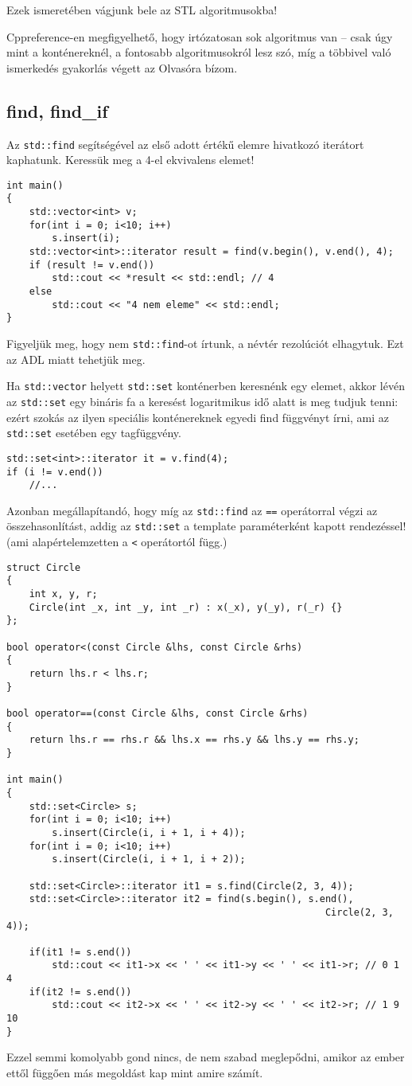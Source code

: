 \documentclass[a4paper,11.5pt,table]{article}
\begin{document}
	Ezek ismeretében vágjunk bele az STL algoritmusokba!
	\begin{note}
		Cppreference-en megfigyelhető, hogy irtózatosan sok algoritmus van -- csak úgy mint a konténereknél, a fontosabb algoritmusokról lesz szó, míg a többivel való ismerkedés gyakorlás végett az Olvasóra bízom.
	\end{note}
	\subsection{find, find\_if}
	Az \texttt{std::find} segítségével az első adott értékű elemre hivatkozó iterátort kaphatunk. Keressük meg a 4-el ekvivalens elemet!
	\begin{lstlisting}
int main()
{
	std::vector<int> v;
	for(int i = 0; i<10; i++)
		s.insert(i);
	std::vector<int>::iterator result = find(v.begin(), v.end(), 4);
	if (result != v.end())
		std::cout << *result << std::endl; // 4
	else
		std::cout << "4 nem eleme" << std::endl;
}
	\end{lstlisting}
	\begin{note}
		Figyeljük meg, hogy nem \texttt{std::find}-ot írtunk, a névtér rezolúciót elhagytuk. Ezt az ADL miatt tehetjük meg.
	\end{note}
	Ha \texttt{std::vector} helyett \texttt{std::set} konténerben keresnénk egy elemet, akkor lévén az \texttt{std::set} egy bináris fa a keresést logaritmikus idő alatt is meg tudjuk tenni: ezért szokás az ilyen speciális konténereknek egyedi find függvényt írni, ami az \texttt{std::set} esetében egy tagfüggvény. 
	\begin{lstlisting}
std::set<int>::iterator it = v.find(4);
if (i != v.end())
	//...
	\end{lstlisting}
	Azonban megállapítandó, hogy míg az \texttt{std::find} az \texttt{==} operátorral végzi az összehasonlítást, addig az \texttt{std::set} a template paraméterként kapott rendezéssel! (ami alapértelemzetten a \texttt{<} operátortól függ.)
\begin{lstlisting}
struct Circle
{
	int x, y, r;
	Circle(int _x, int _y, int _r) : x(_x), y(_y), r(_r) {}
};

bool operator<(const Circle &lhs, const Circle &rhs)
{
	return lhs.r < lhs.r;
}

bool operator==(const Circle &lhs, const Circle &rhs)
{
	return lhs.r == rhs.r && lhs.x == rhs.y && lhs.y == rhs.y;
}

int main()
{
	std::set<Circle> s;
	for(int i = 0; i<10; i++)
		s.insert(Circle(i, i + 1, i + 4));
	for(int i = 0; i<10; i++)
		s.insert(Circle(i, i + 1, i + 2));
	
	std::set<Circle>::iterator it1 = s.find(Circle(2, 3, 4));
	std::set<Circle>::iterator it2 = find(s.begin(), s.end(), 
														Circle(2, 3, 4));
	
	if(it1 != s.end())
		std::cout << it1->x << ' ' << it1->y << ' ' << it1->r; // 0 1 4
	if(it2 != s.end())
		std::cout << it2->x << ' ' << it2->y << ' ' << it2->r; // 1 9 10
}
\end{lstlisting}
	Ezzel semmi komolyabb gond nincs, de nem szabad meglepődni, amikor az ember ettől függően más megoldást kap mint amire számít.
	
\end{document}
